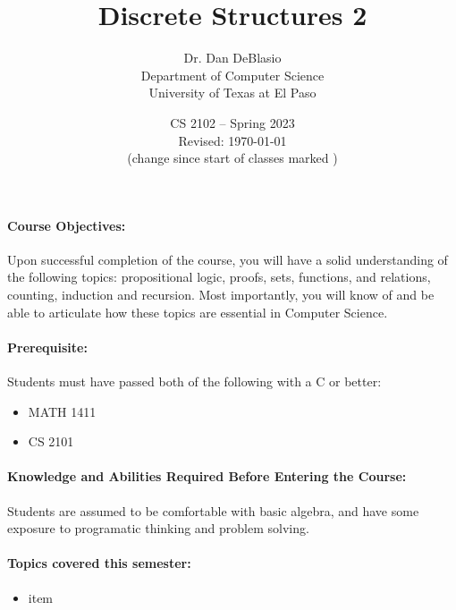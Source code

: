 \documentclass[12pt]{scrartcl}
\title{Discrete Structures 2}\let\Title\@title
\subtitle{
{\small
Dr. Dan DeBlasio\\
Department of Computer Science\\
University of Texas at El Paso\\
}
\vskip-1cm}
\date{\small CS 2102 -- Spring 2023\\ \vspace{1em}Revised: \today\\(change since start of classes marked \change{}{in orange})}
\begin{document}

\maketitle
%
%
\paragraph{Course Objectives:} Upon successful completion of the course, you will have a solid understanding of the following topics: propositional logic, proofs, sets, functions, and relations, counting, induction and recursion. Most importantly, you will know of and be able to articulate how these topics are essential in Computer Science.

\paragraph{Prerequisite:} Students must have passed both of the following with a C or better:
\begin{itemize}
\item MATH 1411
\item CS 2101
\end{itemize}

\paragraph{Knowledge and Abilities Required Before Entering the Course:} Students are assumed to be comfortable with basic algebra, and have some exposure to programatic thinking and problem solving. 

\paragraph{Topics covered this semester:}
\begin{itemize} 
\item item 
\end{itemize}
\end{document}
